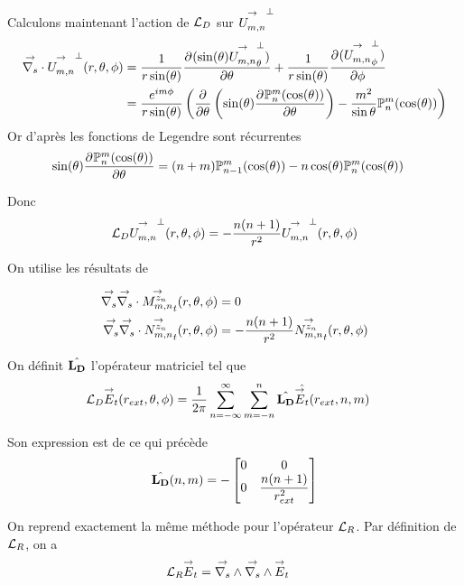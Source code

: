    Calculons maintenant l'action de \(\LD\) sur \(\Umn^\perp\)
    \begin{align*}
      \vdivs{}\Umn^\perp(\rtp) &= \frac{1}{r\sin(\theta)} \ddr{\theta}{(\sin(\theta)\Umn^\perp_\theta)} + \frac{1}{r\sin(\theta)}\ddr{\phi}{(\Umn^\perp_\phi)}
      \\
      &= \frac{e^{im\phi}}{r\sin(\theta)}
      \left(
        \ddr{\theta}{}\left(\sin(\theta)\ddr{\theta}{\Pmn(\cos(\theta))}\right) - \frac{m^2}{\sin\theta}\Pmn(\cos(\theta))
      \right)
    \end{align*}
    Or d’après \cite[\href{https://dlmf.nist.gov/14.10}{sec.~14.10}]{dlmf_nist_2019} les fonctions de Legendre sont récurrentes
    \begin{align}
      \sin(\theta)\ddr{\theta}{\Pmn(\cos(\theta))} &= (n+m)\PP_{n-1}^m(\cos(\theta)) - n\cos(\theta)\Pmn(\cos(\theta))
    \end{align}

    Donc 
    \begin{align*}
      \LD\Umn^\perp(\rtp) = -\frac{n(n+1)}{r^2}\Umn^\perp(\rtp)
    \end{align*}

    On utilise les résultats de \cite{marceaux_high-order_2000}

    \begin{align*}
      \vgrads{}\vdivs{} \Mmn[z_n]_t(r,\theta,\phi) &= 0
      \\
      \vgrads{}\vdivs{} \Nmn[z_n]_t(r,\theta,\phi) &= -\frac{n(n+1)}{r^2}\Nmn[z_n]_t(r,\theta,\phi)
    \end{align*}

    On définit \(\hat{\mLD}\) l'opérateur matriciel tel que
    \begin{align}
      \LD \vE_t (r_{ext},\theta,\phi)
      &= \frac{1}{2\pi}\sum_{n=-\infty}^\infty\sum_{m=-n}^n \hat{\mLD} \hat{\vE_t}(r_{ext},n,m)
    \end{align}

    Son expression est de ce qui précède
    \begin{equation}
      \label{eq:cylindre:fourier:LD}
      \hat{\mLD}(n,m) = -
      \begin{bmatrix}
        0 & 0
        \\
        0 & \frac{n(n+1)}{r_{ext}^2}
      \end{bmatrix}
    \end{equation}

    On reprend exactement la même méthode pour l'opérateur \(\LR\).
    Par définition de \(\LR\), on a
    \begin{align}
      \LR \vE_t & = \vrots{} \vrots{} \vE_t
    \end{align}

